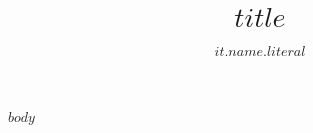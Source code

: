 \documentclass[$if(fontsize)$
$fontsize$,
$endif$
$if(papersize)$
$papersize$paper,
$endif$
$for(classoption)$
$classoption$$sep$,
$endfor$]{thesis-umich}
\title{$title$}
\author{$it.name.literal$}
\begin{document}
$body$
\end{document}
